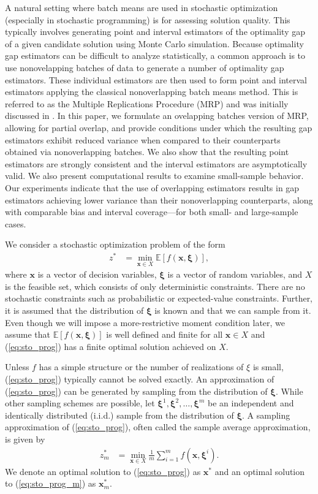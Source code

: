 \documentclass[12pt]{article}
\newcommand{\e}[1]{\mathbb{E} \left[ #1 \right]
}
\newcommand{\x}{\mathbf{x}}
\newcommand{\xs}{\x^*}
\newcommand{\xit}{\boldsymbol{\xi}}
\newcommand{\xiti}{\xit^i}
\begin{document}
A natural setting where batch means are used in stochastic optimization (especially in stochastic programming) is for assessing solution quality. 
This typically involves generating point and interval estimators of the optimality gap of a given candidate solution using Monte Carlo simulation. 
Because optimality gap estimators can be difficult to analyze statistically, a common approach is to use nonovelapping batches of data to generate a number of optimality gap estimators. 
These individual estimators are then used to form point and interval estimators applying the classical nonoverlapping batch means method.
This is referred to as the Multiple Replications Procedure (MRP) and was initially discussed in \citep{Mak1999}.   
In this paper, we formulate an ovelapping batches version of MRP, allowing for partial overlap, and provide conditions under which the resulting gap estimators exhibit reduced variance when compared to their counterparts obtained via nonoverlapping batches.
We also show that the resulting point estimators are strongly consistent and the interval estimators are asymptotically valid. 
We also present computational results to examine small-sample behavior. 
Our experiments indicate that the use of overlapping estimators results in gap estimators achieving lower variance than their nonoverlapping counterparts, along with comparable bias and interval coverage---for both small- and large-sample cases.


We consider a stochastic optimization problem of the form 
\begin{align} \tag{SP} \label{eq:sto_prog} 
	z^* & = \min_{\x \in X} \e{f(\x,\xit)},
\end{align}
where $\x$ is a vector of decision variables, $\xit$ is a vector of random variables, and $X$ is the feasible set, which consists of only deterministic constraints. 
There are no stochastic constraints such as probabilistic or expected-value constraints. 
Further, it is assumed that the distribution of $\xit$ is known and that we can sample from it.
Even though we will impose a more-restrictive moment condition later, we assume that $\e{f(\x,\xit)}$ is well defined and finite for all $\x \in X$ and (\ref{eq:sto_prog}) has a finite optimal solution achieved on $X$.


Unless $f$ has a simple structure or the number of realizations of $\xi$ is small, (\ref{eq:sto_prog}) typically cannot be solved exactly. 
An approximation of (\ref{eq:sto_prog}) can be generated by sampling from the distribution of $\xit$.
While other sampling schemes are possible, let $\xit^1, \xit^2, \dots, \xit^m$ be an independent and identically distributed (i.i.d.) sample from the distribution of $\xit$.
A sampling approximation of (\ref{eq:sto_prog}), often called the sample average approximation, is given by
\begin{align} \tag{SP$_m$} \label{eq:sto_prog_m}
	z_m^* & = \min_{\x \in X} \frac{1}{m} \sum_{i=1}^m f(\x,\xiti).
\end{align}
We denote an optimal solution to (\ref{eq:sto_prog}) as $\xs$ and an optimal solution to (\ref{eq:sto_prog_m}) as $\xs_m$.
\end{document}

